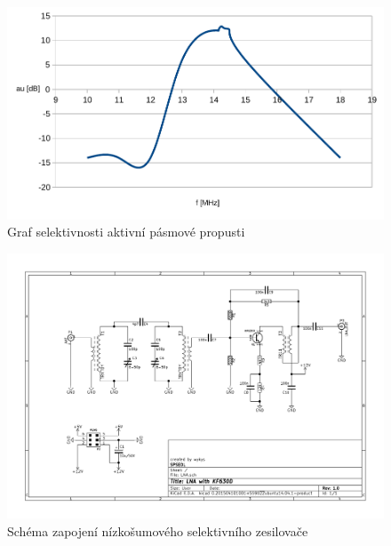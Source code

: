 \begin{figure}[H]
	\centering
	\includegraphics[width=170mm]{img/LNA/sel.pdf}
	\caption{Graf selektivnosti aktivní pásmové propusti}    		
\end{figure}

\begin{landscape}
	\begin{figure}[h]
		\centering 	
		\includegraphics[height=\textwidth]{img/LNA/sch.pdf}
		\caption{Schéma zapojení nízkošumového selektivního zesilovače}	
	\end{figure}
\end{landscape}
%



